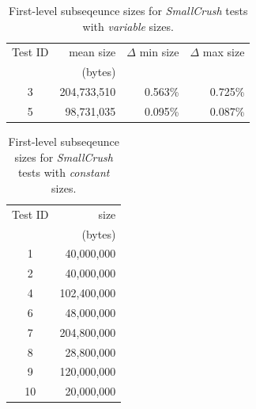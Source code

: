 \documentclass[
  digital,     %
  oneside,     %
  nosansbold,  %
  nocolorbold, %
  nolof,         %
  nolot,         %
]{fithesis4}
\begin{document}
\begin{table}[h]
  \begin{tabularx}{0.75\textwidth}{c|r|r|r}
   Test ID & mean size & $\Delta$ min size & $\Delta$ max size\\
     & (bytes) & & \\
     \midrule
    3 & 204,733,510 & 0.563\% & 0.725\% \\
    5 & 98,731,035 & 0.095\% & 0.087\% \\
  \end{tabularx}
  \caption{First-level subseqeunce sizes for \emph{SmallCrush} tests with \emph{variable} sizes.}
  \label{tab:analysis_smallcrush_variable}
\end{table}

\begin{table}[h]
  \begin{tabularx}{0.36\textwidth}{c|r}
  Test ID & size \\
    & (bytes) \\
  \midrule
    1 & 40,000,000 \\
    2 & 40,000,000 \\
    4 & 102,400,000 \\
    6 & 48,000,000 \\
    7 & 204,800,000 \\
    8 & 28,800,000 \\
    9 & 120,000,000 \\
    10 & 20,000,000 \\

  \end{tabularx}
  \caption{First-level subseqeunce sizes for \emph{SmallCrush} tests with \emph{constant} sizes.}
  \label{tab:analysis_smallcrush}
\end{table}
\end{document}
